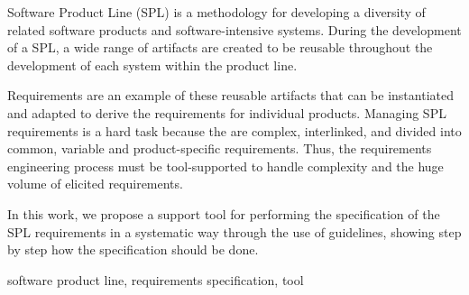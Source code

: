 Software Product Line (SPL) is a methodology for developing a diversity of related 
software products and software-intensive systems. During the development of a SPL, a 
wide range of artifacts are created to be reusable throughout the development of 
each system within the product line.

Requirements are an example of these reusable artifacts that can be instantiated and adapted to 
derive the requirements for individual products. Managing SPL requirements is a hard task because 
the are complex, interlinked, and divided into common, variable and product-specific requirements. 
Thus, the requirements engineering process must be tool-supported to handle complexity and the huge 
volume of elicited requirements.

In this work, we propose a support tool for performing the specification of the SPL requirements in 
a systematic way through the use of guidelines,  showing step by step how the specification should be done.

\begin{keywords}
software product line, requirements specification, tool
\end{keywords}